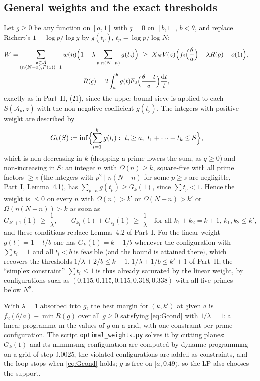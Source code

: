 \documentclass[11pt]{amsart}
\theoremstyle{remark}
\newcommand{\cA}{\mathcal{A}}
\newcommand{\dd}{\mathrm{d}}
\begin{document}
\subsection{General weights and the exact thresholds}
Let $g\ge0$ be any function on $[a,1]$ with $g=0$ on $[b,1]$, $b<\theta$, and replace Richert's $1-\log p/\log y$ by $g(t_p)$, $t_p=\log p/\log N$:
\begin{gather*}
W=\sum_{\substack{n\in\cA\\ (n(N-n),P(z))=1}}w(n)\Bigl(1-\lambda\sum_{p\mid n(N-n)}g(t_p)\Bigr)\ \ge\ X_NV(z)\Bigl(f_2\Bigl(\frac\theta a\Bigr)-\lambda R(g)-o(1)\Bigr),\\
R(g)=2\int_a^bg(t)F_2\Bigl(\frac{\theta-t}a\Bigr)\frac{\dd t}t,
\end{gather*}
exactly as in Part~II, (21), since the upper-bound sieve is applied to each $S(\cA_p,z)$ with the non-negative coefficient $g(t_p)$. The integers with positive weight are described by
\[
G_k(S):=\inf\Bigl\{\sum_{i=1}^kg(t_i):\ t_i\ge a,\ t_1+\cdots+t_k\le S\Bigr\},
\]
which is non-decreasing in $k$ (dropping a prime lowers the sum, as $g\ge0$) and non-increasing in $S$: an integer $n$ with $\Omega(n)\ge k$, square-free with all prime factors $\ge z$ (the integers with $p^2\mid n(N-n)$ for some $p\ge z$ are negligible, Part~I, Lemma~4.1), has $\sum_{p\mid n}g(t_p)\ge G_k(1)$, since $\sum t_p<1$. Hence the weight is $\le0$ on every $n$ with $\Omega(n)>k'$ or $\Omega(N-n)>k'$ or $\Omega(n(N-n))>k$ as soon as
\begin{equation}\label{eq:Gcond}
G_{k'+1}(1)\ \ge\ \frac1\lambda,\qquad G_{k_1}(1)+G_{k_2}(1)\ \ge\ \frac1\lambda\quad\text{for all }k_1+k_2=k+1,\ k_1,k_2\le k',
\end{equation}
and these conditions replace Lemma~4.2 of Part~I. For the linear weight $g(t)=1-t/b$ one has $G_k(1)=k-1/b$ whenever the configuration with $\sum t_i=1$ and all $t_i<b$ is feasible (and the bound is attained there), which recovers the thresholds $1/\lambda+2/b\le k+1$, $1/\lambda+1/b\le k'+1$ of Part~II; the ``simplex constraint'' $\sum t_i\le1$ is thus already saturated by the linear weight, by configurations such as $(0.115,0.115,0.115,0.318,0.338)$ with all five primes below $N^b$.

With $\lambda=1$ absorbed into $g$, the best margin for $(k,k')$ at given $a$ is $f_2(\theta/a)-\min R(g)$ over all $g\ge0$ satisfying \eqref{eq:Gcond} with $1/\lambda=1$: a linear programme in the values of $g$ on a grid, with one constraint per prime configuration. The script \texttt{optimal\_weights.py} solves it by cutting planes: $G_k(1)$ and its minimising configuration are computed by dynamic programming on a grid of step $0.0025$, the violated configurations are added as constraints, and the loop stops when \eqref{eq:Gcond} holds; $g$ is free on $[a,0.49)$, so the LP also chooses the support.
\end{document}
